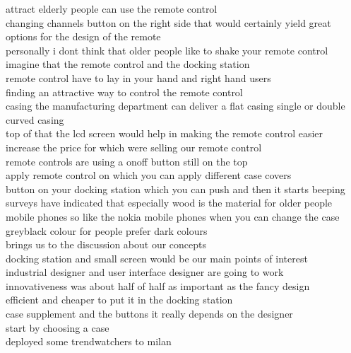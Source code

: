 \documentclass[11pt,a4paper]{article}
\begin{document}
\begin{mdframed}[style=theoremstyle, frametitle={Our System (250 words)}]
attract elderly people can use the remote control
\\ changing channels button on the right side that would certainly yield great options for the design of the remote
\\ personally i dont think that older people like to shake your remote control
\\ imagine that the remote control and the docking station
\\ remote control have to lay in your hand and right hand users
\\ finding an attractive way to control the remote control
\\ casing the manufacturing department can deliver a flat casing single or double curved casing
\\ top of that the lcd screen would help in making the remote control easier
\\ increase the price for which were selling our remote control
\\ remote controls are using a onoff button still on the top
\\ apply remote control on which you can apply different case covers
\\ button on your docking station which you can push and then it starts beeping
\\ surveys have indicated that especially wood is the material for older people
\\ mobile phones so like the nokia mobile phones when you can change the case
\\ greyblack colour for people prefer dark colours
\\ brings us to the discussion about our concepts
\\ docking station and small screen would be our main points of interest
\\ industrial designer and user interface designer are going to work
\\ innovativeness was about half of half as important as the fancy design
\\ efficient and cheaper to put it in the docking station
\\ case supplement and the buttons it really depends on the designer
\\ start by choosing a case
\\ deployed some trendwatchers to milan
\end{mdframed}
\end{document}
